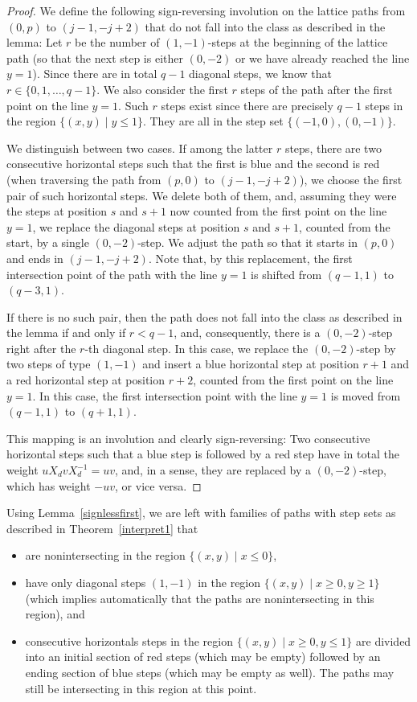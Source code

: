 \documentclass[12pt]{amsart}
\theoremstyle{definition}
\numberwithin{equation}{section}
\begin{document}
\begin{proof}
We define the following sign-reversing involution on the lattice paths from $(0,p)$ to $(j-1,-j+2)$ that do not fall into the class as described in the lemma: 
Let $r$ be the number of $(1,-1)$-steps at the beginning of the lattice path (so that the next step is either $(0,-2)$ or we have already 
reached the line $y=1$). Since there are in total $q-1$ diagonal steps, we know that $r \in \{0,1,\ldots,q-1\}$. We also consider the first 
$r$ steps of the path after the first point on the line $y=1$. Such $r$ steps exist since there are precisely $q-1$ steps in the region $\{(x,y) \mid y \le 1\}$. They are all in the step set $\{(-1,0),(0,-1)\}$.  

We distinguish between two cases. If among the latter $r$ steps, there are two consecutive horizontal steps such that the first is blue and 
the second is red (when traversing the path from $(p,0)$ to $(j-1,-j+2)$), we choose the first pair of such horizontal steps. We delete both of them, and, assuming they were the steps at position $s$ and $s+1$ now counted from the first point on the line $y=1$, 
we replace the diagonal steps at position $s$ and 
$s+1$, counted from the start, by a single $(0,-2)$-step. We adjust the path so that it starts in $(p,0)$ and ends in 
$(j-1,-j+2)$. Note that, by this replacement, the first intersection point of the path with the line $y=1$ is shifted from $(q-1,1)$ to $(q-3,1)$.

If there is no such pair, then the path does not fall into the class as described in the lemma if and only if $r<q-1$, and, consequently, there is a $(0,-2)$-step 
right after the $r$-th diagonal step. In this case, we replace the $(0,-2)$-step by two steps of type $(1,-1)$ and insert a blue horizontal step 
at position $r+1$ and a red horizontal step at position $r+2$, counted from the first point on the line $y=1$. In this case, the first intersection point  with the line $y=1$ is moved from $(q-1,1)$ to $(q+1,1)$. 

This mapping is an involution and clearly sign-reversing: Two consecutive horizontal steps such that a blue step is followed by a red step have in total the weight $u X_d v X_d^{-1} = u v$, and, in a sense, they are replaced by a $(0,-2)$-step, which has weight $-u v$, or vice versa.
\end{proof}


Using Lemma~\ref{signlessfirst}, we are left with families of paths with step sets as described in Theorem~\ref{interpret1}  that 
\begin{itemize} 
\item are nonintersecting in the region $\{(x,y) \mid x \le 0\}$, 
\item have only diagonal steps $(1,-1)$ in the region $\{(x,y) \mid x \ge 0, y \ge 1\}$ (which implies automatically that the paths are nonintersecting in this region), and 
\item consecutive horizontals steps in the region $\{(x,y) \mid x \ge 0, y \le 1\}$ are divided into an initial section of red steps (which may be empty) followed by an ending section of blue steps (which may be empty as well). The paths may still be intersecting in this region at this point.
\end{itemize} 
\end{document}
